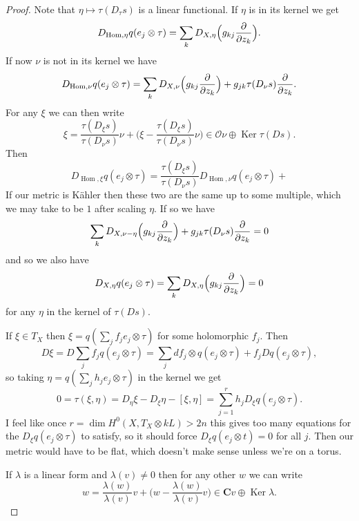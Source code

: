 \documentclass[12pt]{amsart}
\theoremstyle{definition}
\newcommand{\cc}[1]{\mathcal{#1}}
\def\CC{\mathbf{C}}
\DeclareMathOperator{\Ker}{Ker}
\DeclareMathOperator{\Hom}{Hom}
\begin{document}
\begin{proof}
Note that $\eta \mapsto \tau(D_\tau s)$ is a linear functional.
If $\eta$ is in its kernel we get
\[
D_{\Hom,\eta}q ( e_j \otimes \tau )
= \sum_{k} D_{X,\eta}\Bigl(g_{kj} \frac{\partial}{\partial z_k}\Bigr).
\]
If now $\nu$ is not in its kernel we have
\[
D_{\Hom,\nu}q ( e_j \otimes \tau )
= \sum_{k} D_{X,\nu}\Bigl(g_{kj} \frac{\partial}{\partial z_k}\Bigr)
+ g_{jk} \tau(D_\nu s) \frac{\partial}{\partial z_k}.
\]
For any $\xi$ we can then write
\[
\xi = \frac{\tau(D_\xi s)}{\tau(D_\nu s)} \nu
+ \biggl(\xi - \frac{\tau(D_\xi s)}{\tau(D_\nu s)} \nu \biggr)
\in \cc O \nu \oplus \Ker \tau(Ds).
\]
Then
\[
D_{\Hom,\xi} q(e_j \otimes \tau)
= \frac{\tau(D_\xi s)}{\tau(D_\nu s)} D_{\Hom,\nu} q(e_j \otimes \tau)
+
\]
If our metric is K\"ahler then these two are the same up to some multiple, which we may take to be $1$ after scaling $\eta$.
If so we have
\[
\sum_{k} D_{X,\nu-\eta}\Bigl(g_{kj} \frac{\partial}{\partial z_k}\Bigr)
+ g_{jk} \tau(D_\nu s) \frac{\partial}{\partial z_k}
= 0
\]
and so we also have
\[
D_{X,\eta} q(e_j \otimes \tau)
= \sum_{k} D_{X,\eta}\Bigl(g_{kj} \frac{\partial}{\partial z_k}\Bigr)
= 0
\]
for any $\eta$ in the kernel of $\tau(D s)$.

If $\xi \in T_X$ then $\xi = q(\sum_j f_j e_j \otimes \tau)$ for some holomorphic $f_j$.
Then
\[
D \xi 
= D \sum_j f_j q(e_j \otimes \tau)
= \sum_j df_j \otimes q(e_j \otimes \tau)
+ f_j D q(e_j \otimes \tau),
\]
so taking $\eta = q(\sum_j h_j e_j \otimes \tau)$ in the kernel we get
\[
0 
= \tau(\xi,\eta) 
= D_\eta \xi - D_\xi \eta - [\xi, \eta]
= \sum_{j=1}^r h_j D_\xi q(e_j \otimes \tau).
\]
I feel like once $r = \dim H^0(X, T_X \otimes kL) > 2n$ this gives too many equations for the $D_\xi q(e_j \otimes \tau)$ to satisfy, so it should force $D_\xi q(e_j \otimes t) = 0$ for all $j$.
Then our metric would have to be flat, which doesn't make sense unless we're on a torus.

If $\lambda$ is a linear form and $\lambda(v) \not= 0$ then for any other $w$ we can write
\[
w = \frac{\lambda(w)}{\lambda(v)} v
+ \biggl( w - \frac{\lambda(w)}{\lambda(v)} v \biggr)
\in \CC v \oplus \Ker \lambda.
\]
\end{proof}
\end{document}
